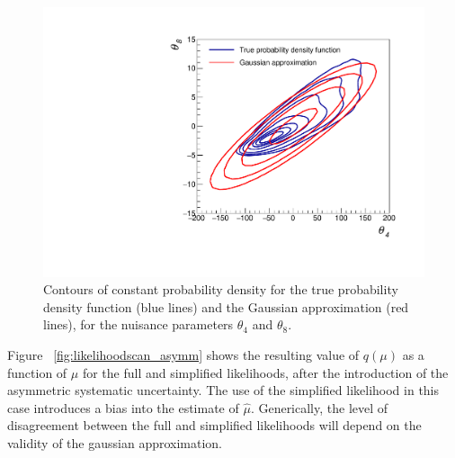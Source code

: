\begin{figure}[hbt]
  \begin{center} 
   \includegraphics[width=1.5\cmsFigWidth]{figures/compare_pdf.pdf}
   \caption{Contours of constant probability density for the true probability density 
   function (blue lines) and the Gaussian approximation (red lines), 
   for the nuisance parameters $\theta_{4}$ and $\theta_{8}$.}
   \label{fig:asymmgauss} 
  \end{center}
\end{figure}

Figure ~\ref{fig:likelihoodscan_asymm} shows the resulting 
value of $q(\mu)$ as a function of $\mu$ for the full and simplified likelihoods, after the introduction of the asymmetric systematic uncertainty.  
The use of the simplified likelihood in this case introduces a bias into the estimate of $\hat{\mu}$. Generically, the level of disagreement between
the full and simplified likelihoods will depend on the validity of the gaussian approximation.

